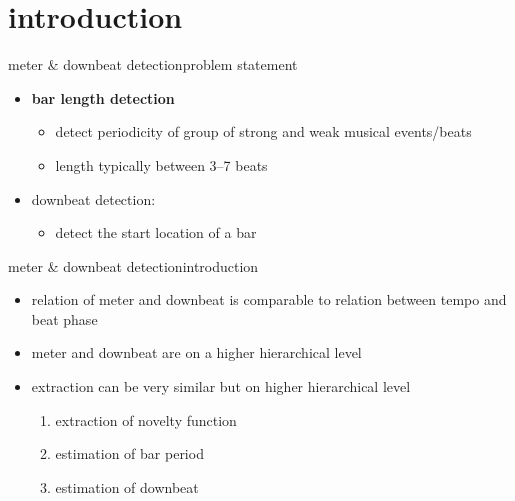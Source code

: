     \section[intro]{introduction}
        \begin{frame}{meter \& downbeat detection}{problem statement}
            \begin{itemize}
                \item \textbf{bar length detection}
                    \begin{itemize}
                        \item   detect periodicity of group of strong and weak musical events/beats
                        \item   length typically between 3--7 beats
                    \end{itemize}
                \bigskip
                \item   downbeat detection:
                    \begin{itemize}
                        \item   detect the start location of a bar
                    \end{itemize}
            \end{itemize}
        \end{frame}
        
            \begin{frame}{meter \& downbeat detection}{introduction}
                \begin{itemize}
                    \item   relation of meter and downbeat is comparable to relation between tempo and beat phase
                    \item   meter and downbeat are on a higher hierarchical level
                    \smallskip
                    \item<2-> extraction can be very similar but on higher hierarchical level
                        \begin{enumerate}
                            \item   extraction of novelty function
                            \item   estimation of bar period
                            \item   estimation of downbeat
                        \end{enumerate}
                \end{itemize}
            \end{frame}

